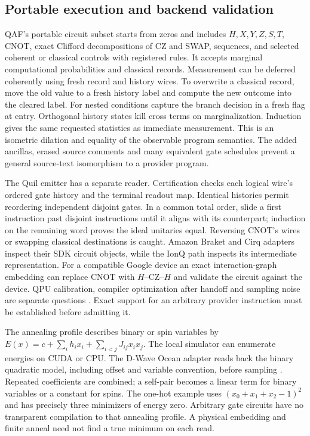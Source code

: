 \subsection{Portable execution and backend validation}
QAF's portable circuit subset starts from zeros and includes $H,X,Y,Z,S,T$, CNOT, exact Clifford decompositions of CZ and SWAP, sequences, and selected coherent or classical controls with registered rules. It accepts marginal computational probabilities and classical records. Measurement can be deferred coherently using fresh record and history wires. To overwrite a classical record, move the old value to a fresh history label and compute the new outcome into the cleared label. For nested conditions capture the branch decision in a fresh flag at entry. Orthogonal history states kill cross terms on marginalization. Induction gives the same requested statistics as immediate measurement. This is an isometric dilation and equality of the observable program semantics. The added ancillas, erased source comments and many equivalent gate schedules prevent a general source-text isomorphism to a provider program.

The Quil emitter has a separate reader. Certification checks each logical wire's ordered gate history and the terminal readout map. Identical histories permit reordering independent disjoint gates. In a common total order, slide a first instruction past disjoint instructions until it aligns with its counterpart; induction on the remaining word proves the ideal unitaries equal. Reversing CNOT's wires or swapping classical destinations is caught. Amazon Braket and Cirq adapters inspect their SDK circuit objects, while the IonQ path inspects its intermediate representation. For a compatible Google device an exact interaction-graph embedding can replace CNOT with $H$--CZ--$H$ and validate the circuit against the device. QPU calibration, compiler optimization after handoff and sampling noise are separate questions \cite{braket,cirq,azure}. Exact support for an arbitrary provider instruction must be established before admitting it.

The annealing profile describes binary or spin variables by $E(x)=c+\sum_i h_i x_i+\sum_{i<j}J_{ij}x_ix_j$. The local simulator can enumerate energies on CUDA or CPU. The D-Wave Ocean adapter reads back the binary quadratic model, including offset and variable convention, before sampling \cite{dwave}. Repeated coefficients are combined; a self-pair becomes a linear term for binary variables or a constant for spins. The one-hot example uses $(x_0+x_1+x_2-1)^2$ and has precisely three minimizers of energy zero. Arbitrary gate circuits have no transparent compilation to that annealing profile. A physical embedding and finite anneal need not find a true minimum on each read.

